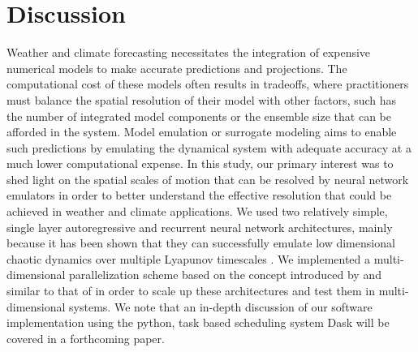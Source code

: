\section{Discussion}
\label{sec:discussion}

Weather and climate forecasting necessitates the integration of expensive
numerical models to make accurate predictions and projections.
The computational cost of these models often results in tradeoffs, where
practitioners must balance the spatial resolution of their model with other
factors, such has the number of integrated model components or the ensemble
size that can be afforded in the system.
Model emulation or surrogate modeling aims to enable such predictions
by emulating the dynamical system with adequate accuracy at a much lower
computational expense.
In this study, our primary interest was to shed light on the spatial scales of
motion that can be resolved by neural network emulators in order to better
understand the effective resolution that could be achieved in weather and
climate applications.
We used two relatively simple, single layer autoregressive and recurrent neural
network architectures, mainly because it has been shown that they can
successfully emulate low dimensional chaotic dynamics over multiple Lyapunov
timescales
\citep{platt_systematic_2022,vlachas_backpropagation_2020,pathak_using_2017,gauthier_next_2021}.
We implemented a multi-dimensional parallelization scheme based on the concept
introduced by \citet{pathak_model-free_2018} and similar to that of
\citet{arcomano_machine_2020}
in order to scale up these architectures and test them in multi-dimensional
systems.
We note that an in-depth discussion of our software implementation using the
python, task based scheduling system Dask \citep{dask_2016} will be covered in a
forthcoming paper.

